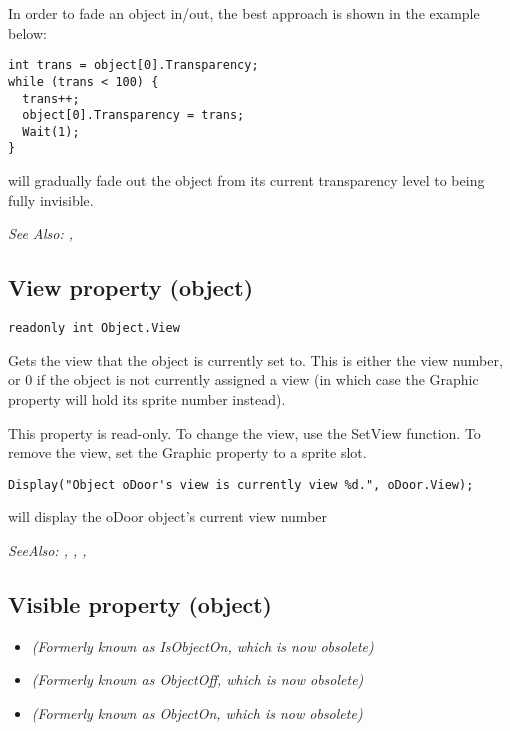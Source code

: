 In order to fade an object in/out, the best approach is shown in the example below:

\begin{verbatim}
int trans = object[0].Transparency;
while (trans < 100) {
  trans++;
  object[0].Transparency = trans;
  Wait(1);
}
\end{verbatim}
will gradually fade out the object from its current transparency level to being fully
invisible.

\it{See Also:} ,


\subsection{View property (object)}\label{Object.View}%

\begin{verbatim}
readonly int Object.View
\end{verbatim}
Gets the view that the object is currently set to. This is either the view number, or 0
if the object is not currently assigned a view (in which case the Graphic property will
hold its sprite number instead).

This property is read-only. To change the view, use the SetView function. To remove
the view, set the Graphic property to a sprite slot.

\begin{verbatim}
Display("Object oDoor's view is currently view %d.", oDoor.View);
\end{verbatim}
will display the oDoor object's current view number

\it{SeeAlso:} ,
, ,


\subsection{Visible property (object)}\label{Object.Visible}%

\begin{itemize}
\item \it{(Formerly known as IsObjectOn, which is now obsolete)}
\item \it{(Formerly known as ObjectOff, which is now obsolete)}
\item \it{(Formerly known as ObjectOn, which is now obsolete)}
\end{itemize}

